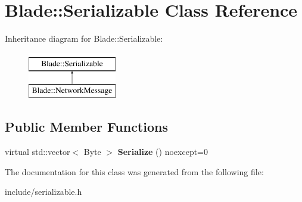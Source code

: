 \hypertarget{class_blade_1_1_serializable}{}\section{Blade\+:\+:Serializable Class Reference}
\label{class_blade_1_1_serializable}
Inheritance diagram for Blade\+:\+:Serializable\+:\begin{figure}[H]
\begin{center}
\leavevmode
\includegraphics[height=2.000000cm]{class_blade_1_1_serializable}
\end{center}
\end{figure}
\subsection*{Public Member Functions}
\begin{DoxyCompactItemize}
\item 
\mbox{\label{class_blade_1_1_serializable_a0ae79c24827f91f620f9c267f17f1088}} 
virtual std\+::vector$<$ Byte $>$ {\bfseries Serialize} () noexcept=0
\end{DoxyCompactItemize}


The documentation for this class was generated from the following file\+:\begin{DoxyCompactItemize}
\item 
include/serializable.\+h\end{DoxyCompactItemize}
